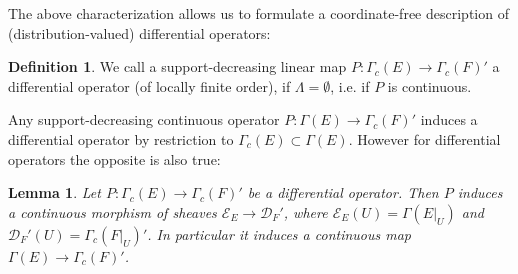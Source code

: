 \documentclass{article}
\newtheorem{Lemma}[Theorem]{Lemma}
\theoremstyle{definition}
\newtheorem{Definition}[Theorem]{Definition}
\begin{document}
The above characterization allows us to formulate a coordinate-free description of (distribution-valued) differential operators:

\begin{Definition} 
We call a support-decreasing linear map $P:\Gamma_c(E)\to \Gamma_c(F)'$ a differential operator (of locally finite order), if $\Lambda=\emptyset$, i.e. if  $P$ is continuous.
\end{Definition}

Any support-decreasing continuous operator $P:\Gamma(E)\to \Gamma_c(F)'$ induces a differential operator by restriction to $\Gamma_c(E)\subset \Gamma(E)$. However for differential operators the opposite is also true:

\begin{Lemma}\label{lem:sheaf} Let $P:\Gamma_c(E)\to \Gamma_c(F)'$ be a differential operator. Then $P$ induces a continuous morphism of sheaves $\mathcal E_E\to \mathcal D_F'$, where $\mathcal E_E(U)=\Gamma(E|_U)$ and $\mathcal D_F'(U)=\Gamma_c(F|_U)'$. In particular it induces a continuous map $\Gamma(E)\to \Gamma_c(F)'$.
\end{Lemma}
\end{document}
